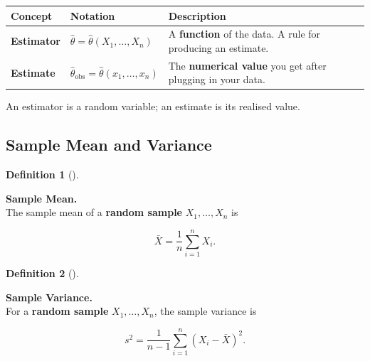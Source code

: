 \documentclass[
  letterpaper,
  DIV=11,
  numbers=noendperiod]{scrreprt}
\theoremstyle{definition}
\theoremstyle{plain}
\theoremstyle{definition}
\newtheorem{definition}{Definition}[chapter]
\theoremstyle{remark}
\begin{document}
\begin{longtable}[]{@{}
  >{\raggedright\arraybackslash}p{}
  >{\raggedright\arraybackslash}p{}
  >{\raggedright\arraybackslash}p{}@{}}
\toprule\noalign{}
\begin{minipage}[b]{\linewidth}\raggedright
Concept
\end{minipage} & \begin{minipage}[b]{\linewidth}\raggedright
Notation
\end{minipage} & \begin{minipage}[b]{\linewidth}\raggedright
Description
\end{minipage} \\
\midrule\noalign{}
\endhead
\bottomrule\noalign{}
\endlastfoot
\textbf{Estimator} & \(\hat{\theta} = \hat{\theta}(X_1, \dots, X_n)\) &
A \textbf{function} of the data. A rule for producing an estimate. \\
\textbf{Estimate} &
\(\hat{\theta}_{\text{obs}} = \hat{\theta}(x_1, \dots, x_n)\) & The
\textbf{numerical value} you get after plugging in your data. \\
\end{longtable}

An estimator is a random variable; an estimate is its realised value.

\subsection{Sample Mean and Variance}\label{sample-mean-and-variance}

\begin{definition}[]\protect\hypertarget{def-sample-mean}{}\label{def-sample-mean}

\textbf{Sample Mean.}\\
The sample mean of a \textbf{random sample} \(X_1,\ldots,X_n\) is

\[
\bar{X} = \frac{1}{n}\sum_{i=1}^n X_i.
\]

\end{definition}

\begin{definition}[]\protect\hypertarget{def-sample-variance}{}\label{def-sample-variance}

\textbf{Sample Variance.}\\
For a \textbf{random sample} \(X_1,\ldots,X_n\), the sample variance is

\[
s^2 = \frac{1}{n-1}\sum_{i=1}^n (X_i - \bar{X})^2.
\]

\end{definition}
\end{document}
